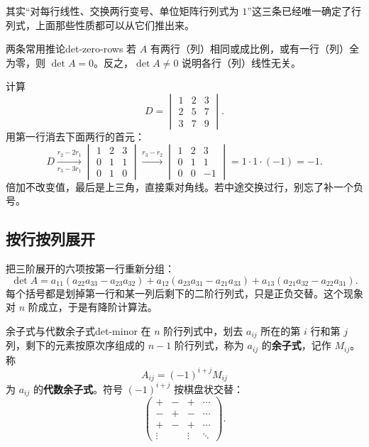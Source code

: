 其实“对每行线性、交换两行变号、单位矩阵行列式为 $1$”这三条已经唯一确定了行列式，上面那些性质都可以从它们推出来。

\begin{conclusion}{两条常用推论}{det-zero-rows}
若 $A$ 有两行（列）相同或成比例，或有一行（列）全为零，则 $\det A=0$。反之，$\det A\neq0$ 说明各行（列）线性无关。
\end{conclusion}

计算
\[
D=\begin{vmatrix}
1&2&3\\
2&5&7\\
3&7&9
\end{vmatrix}.
\]
用第一行消去下面两行的首元：
\[
D\xrightarrow[r_3-3r_1]{r_2-2r_1}
\begin{vmatrix}
1&2&3\\
0&1&1\\
0&1&0
\end{vmatrix}
\xrightarrow{r_3-r_2}
\begin{vmatrix}
1&2&3\\
0&1&1\\
0&0&-1
\end{vmatrix}
=1\cdot1\cdot(-1)=-1.
\]
倍加不改变值，最后是上三角，直接乘对角线。若中途交换过行，别忘了补一个负号。

\subsection{按行按列展开}

把三阶展开的六项按第一行重新分组：
\[
\det A=a_{11}(a_{22}a_{33}-a_{23}a_{32})
+a_{12}(a_{23}a_{31}-a_{21}a_{33})
+a_{13}(a_{21}a_{32}-a_{22}a_{31}).
\]
每个括号都是划掉第一行和某一列后剩下的二阶行列式，只是正负交替。这个现象对 $n$ 阶成立，于是有降阶计算法。

\begin{mydef}{余子式与代数余子式}{det-minor}
在 $n$ 阶行列式中，划去 $a_{ij}$ 所在的第 $i$ 行和第 $j$ 列，剩下的元素按原次序组成的 $n-1$ 阶行列式，称为 $a_{ij}$ 的\textbf{余子式}，记作 $M_{ij}$。称
\[
A_{ij}=(-1)^{i+j}M_{ij}
\]
为 $a_{ij}$ 的\textbf{代数余子式}。符号 $(-1)^{i+j}$ 按棋盘状交替：
\[
\begin{pmatrix}
+&-&+&\cdots\\
-&+&-&\cdots\\
+&-&+&\cdots\\
\vdots& &\vdots&\ddots
\end{pmatrix}.
\]
\end{mydef}

